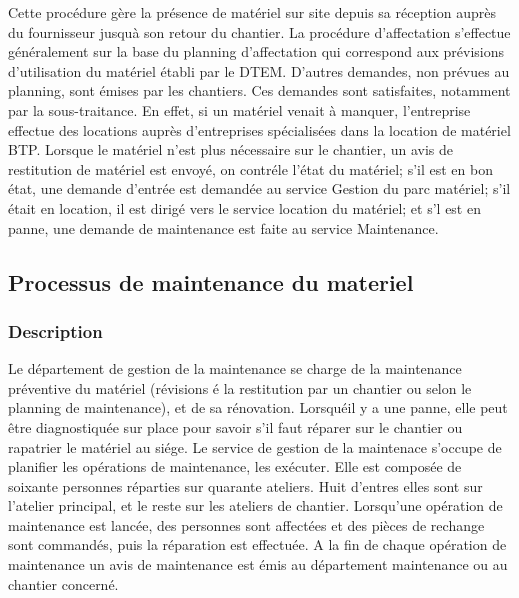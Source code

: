 				Cette procédure gère la présence de matériel sur site depuis sa réception auprès du fournisseur jusquà son retour du chantier.
				\newline
				La procédure d'affectation s'effectue généralement sur la base du planning d'affectation qui correspond aux prévisions d'utilisation du matériel établi par le DTEM. D'autres demandes, non prévues au planning, sont émises par les chantiers. Ces demandes sont satisfaites, notamment par la sous-traitance. 
				\newline
				En effet, si un matériel venait à manquer, l'entreprise effectue des locations auprès d'entreprises spécialisées dans la location de matériel BTP. Lorsque le matériel n'est plus nécessaire sur le chantier, un avis de restitution de matériel est envoyé, on contréle l'état du matériel; s'il est en bon état, une demande d'entrée est demandée au service Gestion du parc matériel; s'il était en location, il est dirigé vers le service location du matériel; et s'l est en panne, une demande de maintenance est faite au service Maintenance.


				
				
				
		\subsection{Processus de maintenance du materiel}
				\subsubsection{Description}
				
				Le département de gestion de la maintenance se charge de la maintenance préventive du matériel (révisions é la restitution par un chantier ou selon le planning de maintenance), et de sa rénovation. Lorsquéil y a une panne, elle peut être diagnostiquée sur place pour savoir s'il faut réparer sur le chantier ou rapatrier le matériel au siége.
				\newline
				Le service de gestion de la maintenace s'occupe de planifier les opérations de maintenance, les exécuter. Elle est composée de soixante personnes réparties sur quarante ateliers. Huit d'entres elles sont sur l'atelier principal, et le reste sur les ateliers de chantier. Lorsqu'une opération de maintenance est lancée, des personnes sont affectées et des pièces de rechange sont commandés, puis la réparation est effectuée. A la fin de chaque opération de maintenance un avis de maintenance est émis au département maintenance ou au chantier concerné.
				
